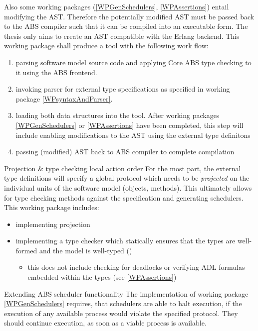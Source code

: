 \documentclass[paper=a4,nochapname,accentcolor=tud9c]{tudexercise}
\makeatletter
\newcommand\textcitep[1]{\mkbibparens{\textcite{#1}}}
\def\namedlabel#1#2{\begingroup
    #1%
    \def\@currentlabel{\thedescriptcount}%
    \phantomsection\label{#2}\endgroup
}
\newcounter{descriptcount}
\renewcommand*\thedescriptcount{[\Alph{descriptcount}]}}
\renewcommand*\thedescriptcount{\roman{descriptcount}}}
\makeatother
\begin{document}
\begin{enumdescript}
    Also some working packages (\ref{WPGenSchedulers}, \ref{WPAssertions}) entail modifying the AST.
    Therefore the potentially modified AST must be passed back to the ABS
    compiler such that it can be compiled into an executable
    form. The thesis only aims to create an AST compatible with the Erlang backend.
    This working package shall produce a tool with the following work flow:
    \begin{enumerate}[label=\arabic*)]
      \item parsing software model source code and applying Core ABS type
        checking to it using the ABS frontend.
      \item invoking parser for external type specifications as specified in working
        package \ref{WPsyntaxAndParser}.
      \item loading both data structures into the tool. After working packages
        \ref{WPGenSchedulers} or \ref{WPAssertions} have been completed, this step will include enabling modifications to the AST using the external type definitons
      \item passing (modified) AST back to ABS compiler to complete compilation
    \end{enumerate}
  \item[\namedlabel{Projection \& type checking local action order}{WPProjectionAndTC}]%
    For the most part, the external type definitions will specify a global
    protocol which needs to be \emph{projected} on the individual units of the
    software model (objects, methods).
    This ultimately allows for type checking methods against the specification
    and generating schedulers.
    This working package includes:
    \begin{itemize}
      \item implementing projection
      \item implementing a type checker which statically ensures that the
        types are well-formed and the model is well-typed \textcitep{kamburjan2018stateful}
        \begin{itemize}
          \item this does not include checking for deadlocks or verifying ADL
            formulas embedded within the types (see \ref{WPAssertions})
        \end{itemize}
    \end{itemize}
  \item[\namedlabel{Extending ABS scheduler functionality}{WPExtendScheduler}]%
    The implementation of working package \ref{WPGenSchedulers} requires, that schedulers are able to
    halt execution, if the execution of any available process would violate the
    specified protocol. They should continue execution, as soon as a viable
    process is available.


\end{enumdescript}
\end{document}
